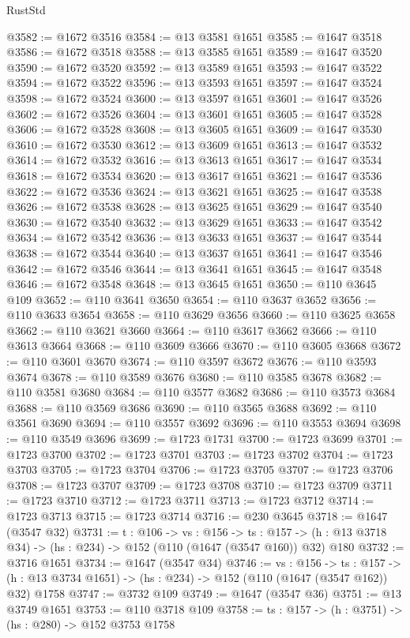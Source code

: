 \begin{lexlean}{RustStd}
\begin{coremodule}
@3582 := @1672 @3516
@3584 := @13 @3581 @1651
@3585 := @1647 @3518
@3586 := @1672 @3518
@3588 := @13 @3585 @1651
@3589 := @1647 @3520
@3590 := @1672 @3520
@3592 := @13 @3589 @1651
@3593 := @1647 @3522
@3594 := @1672 @3522
@3596 := @13 @3593 @1651
@3597 := @1647 @3524
@3598 := @1672 @3524
@3600 := @13 @3597 @1651
@3601 := @1647 @3526
@3602 := @1672 @3526
@3604 := @13 @3601 @1651
@3605 := @1647 @3528
@3606 := @1672 @3528
@3608 := @13 @3605 @1651
@3609 := @1647 @3530
@3610 := @1672 @3530
@3612 := @13 @3609 @1651
@3613 := @1647 @3532
@3614 := @1672 @3532
@3616 := @13 @3613 @1651
@3617 := @1647 @3534
@3618 := @1672 @3534
@3620 := @13 @3617 @1651
@3621 := @1647 @3536
@3622 := @1672 @3536
@3624 := @13 @3621 @1651
@3625 := @1647 @3538
@3626 := @1672 @3538
@3628 := @13 @3625 @1651
@3629 := @1647 @3540
@3630 := @1672 @3540
@3632 := @13 @3629 @1651
@3633 := @1647 @3542
@3634 := @1672 @3542
@3636 := @13 @3633 @1651
@3637 := @1647 @3544
@3638 := @1672 @3544
@3640 := @13 @3637 @1651
@3641 := @1647 @3546
@3642 := @1672 @3546
@3644 := @13 @3641 @1651
@3645 := @1647 @3548
@3646 := @1672 @3548
@3648 := @13 @3645 @1651
@3650 := @110 @3645 @109
@3652 := @110 @3641 @3650
@3654 := @110 @3637 @3652
@3656 := @110 @3633 @3654
@3658 := @110 @3629 @3656
@3660 := @110 @3625 @3658
@3662 := @110 @3621 @3660
@3664 := @110 @3617 @3662
@3666 := @110 @3613 @3664
@3668 := @110 @3609 @3666
@3670 := @110 @3605 @3668
@3672 := @110 @3601 @3670
@3674 := @110 @3597 @3672
@3676 := @110 @3593 @3674
@3678 := @110 @3589 @3676
@3680 := @110 @3585 @3678
@3682 := @110 @3581 @3680
@3684 := @110 @3577 @3682
@3686 := @110 @3573 @3684
@3688 := @110 @3569 @3686
@3690 := @110 @3565 @3688
@3692 := @110 @3561 @3690
@3694 := @110 @3557 @3692
@3696 := @110 @3553 @3694
@3698 := @110 @3549 @3696
@3699 := @1723 @1731
@3700 := @1723 @3699
@3701 := @1723 @3700
@3702 := @1723 @3701
@3703 := @1723 @3702
@3704 := @1723 @3703
@3705 := @1723 @3704
@3706 := @1723 @3705
@3707 := @1723 @3706
@3708 := @1723 @3707
@3709 := @1723 @3708
@3710 := @1723 @3709
@3711 := @1723 @3710
@3712 := @1723 @3711
@3713 := @1723 @3712
@3714 := @1723 @3713
@3715 := @1723 @3714
@3716 := @230 @3645
@3718 := @1647 (@3547 @32)
@3731 := {t : @106} ->
  {vs : @156} ->
  {ts : @157} -> (h : @13 @3718 @34) -> (hs : @234) -> @152 (@110 (@1647 (@3547 @160)) @32) @180
@3732 := @3716 @1651
@3734 := @1647 (@3547 @34)
@3746 := {vs : @156} ->
  {ts : @157} -> (h : @13 @3734 @1651) -> (hs : @234) -> @152 (@110 (@1647 (@3547 @162)) @32) @1758
@3747 := @3732 @109
@3749 := @1647 (@3547 @36)
@3751 := @13 @3749 @1651
@3753 := @110 @3718 @109
@3758 := {ts : @157} -> (h : @3751) -> (hs : @280) -> @152 @3753 @1758

\end{coremodule}
\end{lexlean}

